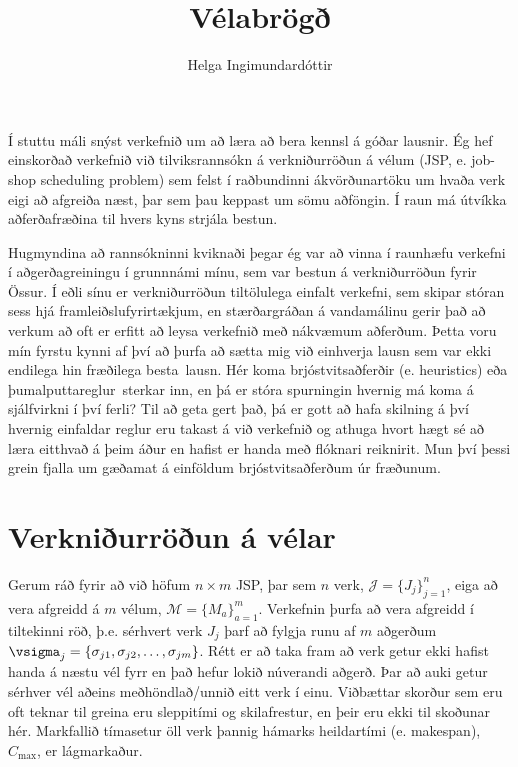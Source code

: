 \documentclass[10pt,a4paper]{article}
\title{Vélabrögð} %
\author{Helga Ingimundardóttir}
\begin{document}
\maketitle


Í stuttu máli snýst verkefnið um að læra að bera kennsl á góðar lausnir. 
Ég hef einskorðað verkefnið við tilviksrannsókn á verkniðurröðun á vélum (JSP, 
e. job-shop scheduling problem) 
sem felst í raðbundinni ákvörðunartöku um hvaða verk eigi að afgreiða næst, þar 
sem þau keppast um sömu aðföngin.
Í raun má útvíkka aðferðafræðina til hvers kyns strjála bestun. 

Hugmyndina að rannsókninni kviknaði þegar ég var að vinna í raunhæfu verkefni í 
aðgerðagreiningu í grunnnámi mínu, sem var bestun á verkniðurröðun fyrir 
Össur. Í eðli sínu er verkniðurröðun tiltölulega einfalt verkefni, sem skipar 
stóran sess hjá framleiðslufyrirtækjum, en stærðargráðan á vandamálinu gerir 
það að verkum að oft er erfitt að leysa verkefnið með nákvæmum aðferðum. 
Þetta voru mín fyrstu kynni af því að þurfa að sætta mig við einhverja lausn 
sem var ekki endilega hin fræðilega \glqq besta\grqq\ lausn. 
Hér koma brjóstvitsaðferðir (e. heuristics) eða \glqq þumalputtareglur\grqq\ 
sterkar 
inn, en þá er stóra spurningin hvernig má koma á sjálfvirkni í því ferli? 
Til að geta gert það, þá er gott að hafa skilning á því hvernig einfaldar 
reglur eru takast á við verkefnið og athuga hvort hægt sé að læra eitthvað á 
þeim áður en hafist er handa með flóknari reiknirit. 
Mun því þessi grein fjalla um gæðamat á einföldum brjóstvitsaðferðum úr 
fræðunum. 

\section*{Verkniðurröðun á vélar}
Gerum ráð fyrir að við höfum $n\times m$ JSP, 
þar sem $n$ verk, $\mathcal{J}=\{J_j\}_{j=1}^n$, 
eiga að vera afgreidd á $m$ vélum, $\mathcal{M}=\{M_a\}_{a=1}^m$. 
Verkefnin þurfa að vera afgreidd í tiltekinni röð, þ.e. sérhvert verk $J_j$ 
þarf að fylgja runu af $m$ aðgerðum 
$\vsigma_j=\{\sigma_{j1},\sigma_{j2},\dotsc,\sigma_{jm}\}$. 
Rétt er að taka fram að verk getur ekki hafist handa á næstu vél fyrr en það 
hefur lokið núverandi aðgerð. 
Þar að auki getur sérhver vél aðeins meðhöndlað/unnið eitt verk í einu. 
Viðbættar skorður sem eru oft teknar til greina eru sleppitími og skilafrestur, 
en þeir eru ekki til skoðunar hér.
Markfallið tímasetur öll verk þannig hámarks heildartími (e. makespan), 
$C_{\max}$, er lágmarkaður. 
\end{document}
